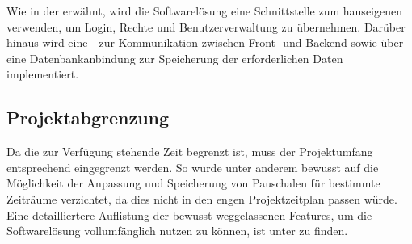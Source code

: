 Wie in der  erwähnt, wird die Softwarelösung eine Schnittstelle zum hauseigenen  verwenden, um Login, Rechte und Benutzerverwaltung zu übernehmen. Darüber hinaus wird eine - zur Kommunikation zwischen Front- und Backend sowie über eine Datenbankanbindung zur Speicherung der erforderlichen Daten implementiert.

\subsection{Projektabgrenzung}
\label{sec:Einführung-Definitionsphase:Projektabgrenzung}

Da die zur Verfügung stehende Zeit begrenzt ist, muss der Projektumfang entsprechend eingegrenzt werden. So wurde unter anderem bewusst auf die Möglichkeit der Anpassung und Speicherung von Pauschalen für bestimmte Zeiträume verzichtet, da dies nicht in den engen Projektzeitplan passen würde. Eine detailliertere Auflistung der bewusst weggelassenen Features, um die Softwarelösung vollumfänglich nutzen zu können, ist unter  zu finden.